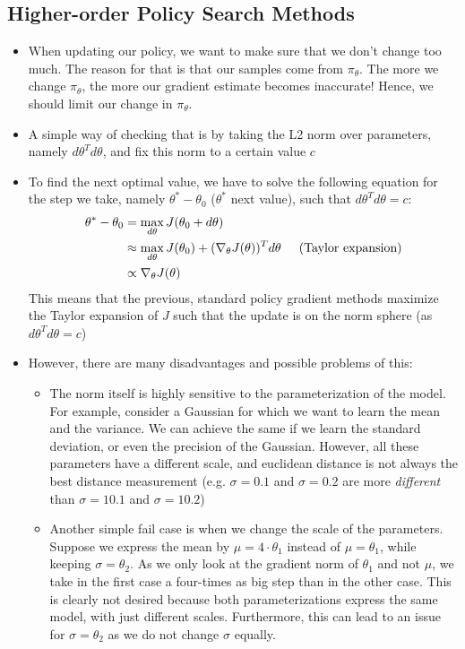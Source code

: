 \subsection{Higher-order Policy Search Methods}
\begin{itemize}
	\item When updating our policy, we want to make sure that we don't change too much. The reason for that is that our samples come from $\pi_{\theta}$. The more we change $\pi_{\theta}$, the more our gradient estimate becomes inaccurate! Hence, we should limit our change in $\pi_{\theta}$.
	\item A simple way of checking that is by taking the L2 norm over parameters, namely $d\theta^T d\theta$, and fix this norm to a certain value $c$
	\item To find the next optimal value, we have to solve the following equation for the step we take, namely $\theta^{*}-\theta_0$ ($\theta^{*}$ next value), such that $d\theta^T d\theta=c$:
	\begin{equation*}
		\begin{split}
			\theta^{*}-\theta_0 & = \max_{d\theta} J(\theta_0 + d\theta)\\
			& \approx \max_{d\theta} J(\theta_0) + (\nabla_{\theta} J(\theta))^T d\theta \hspace{5mm}\text{(Taylor expansion)}\\
			& \propto \nabla_{\theta} J(\theta)
		\end{split}
	\end{equation*}
	This means that the previous, standard policy gradient methods maximize the Taylor expansion of $J$ such that the update is on the norm sphere (as $d\theta^T d\theta=c$)
	\item However, there are many disadvantages and possible problems of this:
	\begin{itemize}
		\item The norm itself is highly sensitive to the parameterization of the model. For example, consider a Gaussian for which we want to learn the mean and the variance. We can achieve the same if we learn the standard deviation, or even the precision of the Gaussian. However, all these parameters have a different scale, and euclidean distance is not always the best distance measurement (e.g. $\sigma=0.1$ and $\sigma=0.2$ are more \textit{different} than $\sigma=10.1$ and $\sigma=10.2$)
		\item Another simple fail case is when we change the scale of the parameters. Suppose we express the mean by $\mu=4\cdot \theta_1$ instead of $\mu=\theta_1$, while keeping $\sigma=\theta_2$. As we only look at the gradient norm of $\theta_1$ and not $\mu$, we take in the first case a four-times as big step than in the other case. This is clearly not desired because both parameterizations express the same model, with just different scales. Furthermore, this can lead to an issue for $\sigma=\theta_2$ as we do not change $\sigma$ equally.

\end{itemize}
\end{itemize}
